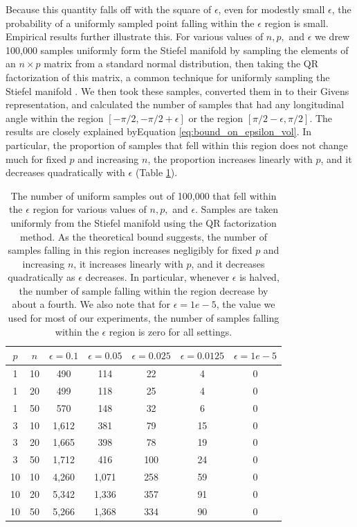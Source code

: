 \documentclass[ba]{imsart}
\numberwithin{equation}{section}
\theoremstyle{plain}
\begin{document}
\noindent Because this quantity falls off with the square of $\epsilon$, even for modestly small $\epsilon$, the probability of a uniformly sampled point falling within the $\epsilon$ region is small. Empirical results further illustrate this. For various values of $n, p,$ and $\epsilon$ we drew 100,000 samples uniformly form the Stiefel manifold by sampling the elements of an $n \times p$ matrix from a standard normal distribution, then taking the QR factorization of this matrix, a common technique for uniformly sampling the Stiefel manifold \citep{muirhead2009aspects}. We then took these samples, converted them in to their Givens representation, and calculated the number of samples that had any longitudinal angle within the region $[-\pi/2, -\pi/2+\epsilon]$ or the region $[\pi/2-\epsilon, \pi/2]$. The results are closely explained byEquation \ref{eq:bound_on_epsilon_vol}. In particular, the proportion of samples that fell within this region does not change much for fixed $p$ and increasing $n$, the proportion increases linearly with $p$, and it decreases quadratically with $\epsilon$ (Table \ref{tab:uniform_epsilon_region}).  

\begin{table}
\begin{tabular}{|cc||ccccc|}
\hline
$p$ & $n$  & $\epsilon = 0.1$ & $\epsilon = 0.05$ & $\epsilon = 0.025$ & $\epsilon = 0.0125$ & $\epsilon = 1e-5$\\
\hline
\hline
1 & 10 & 490 & 114 & 22 & 4 & 0\\
1 & 20 & 499 & 118 & 25 & 4 & 0\\
1 & 50 & 570 & 148 & 32 & 6 & 0 \\
\hline
3 & 10 & 1,612 & 381 & 79  & 15 & 0\\
3 & 20 & 1,665 & 398 & 78 & 19 & 0\\
3 & 50 & 1,712 & 416 & 100  & 24 & 0\\
\hline
10 & 10 & 4,260 & 1,071 & 258 & 59 & 0\\
10 & 20 & 5,342 & 1,336 & 357 & 91 & 0\\
10 & 50 & 5,266 & 1,368 & 334 & 90 & 0 \\
\hline
\end{tabular}
\caption{The number of uniform samples out of 100,000 that fell within the $\epsilon$ region for various values of $n, p,$ and $\epsilon$. Samples are taken uniformly from the Stiefel manifold using the QR factorization method. As the theoretical bound suggests, the number of samples falling in this region increases negligibly for fixed $p$ and increasing $n$, it increases linearly with $p$, and it decreases quadratically as $\epsilon$ decreases. In particular, whenever $\epsilon$ is halved, the number of sample falling within the region decrease by about a fourth. We also note that for $\epsilon = 1e-5$, the value we used for most of our experiments, the number of samples falling within the $\epsilon$ region is zero for all settings.}
\label{tab:uniform_epsilon_region}
\end{table}
\end{document}
